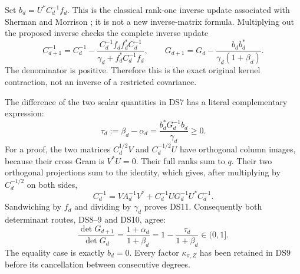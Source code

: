 \documentclass[11pt]{article}
\begin{document}
Set \(b_d=U^*C_d^{-1}f_d\). This is the classical rank-one inverse
update associated with Sherman and Morrison \cite{dsroot:SM}; it is not a new
inverse-matrix formula. Multiplying out the proposed inverse
checks the complete inverse update
\begin{equation}\label{dsroot:eq:inverseupdate}
C_{d+1}^{-1}=C_d^{-1}
-\frac{C_d^{-1}f_df_d^*C_d^{-1}}
{\gamma_d+f_d^*C_d^{-1}f_d},\qquad
G_{d+1}=G_d-\frac{b_db_d^*}{\gamma_d(1+\beta_d)}.
\tag{DS10}
\end{equation}
The denominator is positive. Therefore this is the exact original
kernel contraction, not an inverse of a restricted covariance.

The difference of the two scalar quantities in DS7 has a literal
complementary expression:
\begin{equation}\label{dsroot:eq:gap}
\boxed{\tau_d:=\beta_d-\alpha_d
=\frac{b_d^*G_d^{-1}b_d}{\gamma_d}\geq0.}
\tag{DS11}
\end{equation}
For a proof, the two matrices \(C_d^{1/2}V\) and \(C_d^{-1/2}U\)
have orthogonal column images, because their cross Gram is \(V^*U=0\).
Their full ranks sum to \(q\). Their two orthogonal projections sum
to the identity, which gives, after multiplying by \(C_d^{-1/2}\)
on both sides,
\[
C_d^{-1}=VA_d^{-1}V^*
+C_d^{-1}UG_d^{-1}U^*C_d^{-1}.
\]
Sandwiching by \(f_d\) and dividing by \(\gamma_d\) proves DS11.
Consequently both determinant routes, DS8--9 and DS10, agree:
\begin{equation}\label{dsroot:eq:kernelstep}
\boxed{\frac{\det G_{d+1}}{\det G_d}
=\frac{1+\alpha_d}{1+\beta_d}
=1-\frac{\tau_d}{1+\beta_d}\in(0,1].}
\tag{DS12}
\end{equation}
The equality case is exactly \(b_d=0\). Every factor
\(\kappa_{\pi,Z}\) has been retained in DS9 before its cancellation
between consecutive degrees.
\end{document}
